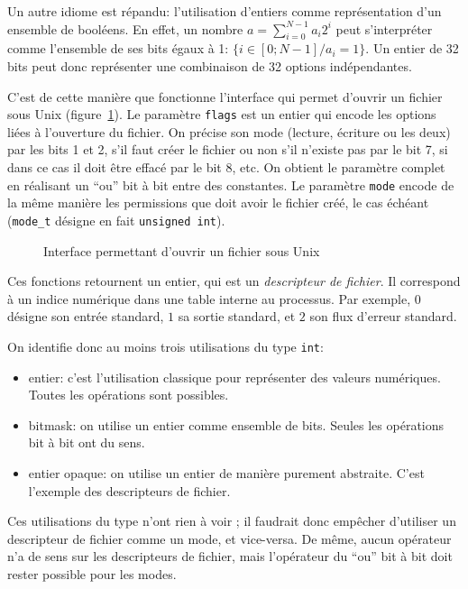 Un autre idiome est répandu: l'utilisation d'entiers comme représentation d'un
ensemble de booléens. En effet, un nombre $a = \sum_{i=0}^{N-1} a_i 2^i$ peut
s'interpréter comme l'ensemble de ses bits égaux à 1: $\{ i ∈ [0;N-1] / a_i = 1
\}$. Un entier de 32 bits peut donc représenter une combinaison de 32 options
indépendantes.

C'est de cette manière que fonctionne l'interface qui permet d'ouvrir un fichier
sous Unix (figure~\ref{fig:unix-open}). Le paramètre \texttt{flags} est un
entier qui encode les options liées à l'ouverture du fichier. On précise son
mode (lecture, écriture ou les deux) par les bits 1 et 2, s'il faut créer le
fichier ou non s'il n'existe pas par le bit 7, si dans ce cas il doit être
effacé par le bit 8, etc. On obtient le paramètre complet en réalisant un
\enquote{ou} bit à bit entre des constantes. Le paramètre \texttt{mode} encode
de la même manière les permissions que doit avoir le fichier créé, le cas
échéant (\texttt{mode\_t} désigne en fait \texttt{unsigned int}).

\begin{figure}[h]
    \caption{Interface permettant d'ouvrir un fichier sous Unix}
    \label{fig:unix-open}
\end{figure}

Ces fonctions retournent un entier, qui est un \emph{descripteur de fichier}. Il
correspond à un indice numérique dans une table interne au processus. Par
exemple, $0$ désigne son entrée standard, $1$ sa sortie standard, et $2$ son
flux d'erreur standard.

On identifie donc au moins trois utilisations du type \texttt{int}:

\begin{itemize}
    \item entier: c'est l'utilisation classique pour représenter des valeurs
        numériques. Toutes les opérations sont possibles.
    \item bitmask: on utilise un entier comme ensemble de bits. Seules les
        opérations bit à bit ont du sens.
    \item entier opaque: on utilise un entier de manière purement abstraite.
        C'est l'exemple des descripteurs de fichier.
\end{itemize}

Ces utilisations du type n'ont rien à voir ; il faudrait donc empêcher
d'utiliser un descripteur de fichier comme un mode, et vice-versa. De même,
aucun opérateur n'a de sens sur les descripteurs de fichier, mais l'opérateur
\texttt{\textbar{}} du \enquote{ou} bit à bit doit rester possible pour les
modes.

